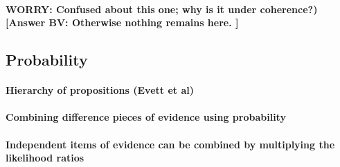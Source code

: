 \documentclass[10pt]{article}
\begin{document}
\paragraph{WORRY: Confused about this one; why is it under coherence?) [Answer BV: Otherwise nothing remains here. ]}

\subsection{Probability}


\paragraph{Hierarchy of propositions (Evett et al)}


\paragraph{Combining difference pieces of evidence using probability}


\paragraph{Independent items of evidence can be combined by multiplying the likelihood ratios}
\end{document}
